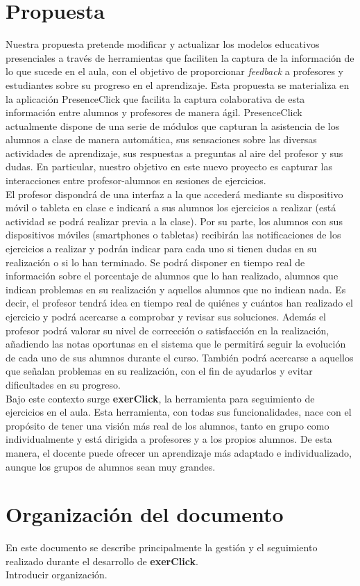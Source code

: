 \section{Propuesta}

Nuestra propuesta pretende modificar y actualizar los modelos educativos presenciales a través de herramientas que faciliten la captura de la información de lo que sucede en el aula, con el objetivo de proporcionar \textit{feedback} a profesores y estudiantes sobre su progreso en el aprendizaje. Esta propuesta se materializa en la aplicación PresenceClick que facilita la captura colaborativa de esta información entre alumnos y profesores de manera ágil. PresenceClick actualmente dispone de una serie de módulos que capturan la asistencia de los alumnos a clase de manera automática, sus sensaciones sobre las diversas actividades de aprendizaje, sus respuestas a preguntas al aire del profesor y sus dudas. En particular, nuestro objetivo en este nuevo proyecto es capturar las interacciones entre profesor-alumnos en sesiones de ejercicios.\\

El profesor dispondrá de una interfaz a la que accederá mediante su dispositivo móvil o tableta en clase e indicará a sus alumnos los ejercicios a realizar (está actividad se podrá realizar previa a la clase). Por su parte, los alumnos con sus dispositivos móviles (smartphones o tabletas) recibirán las notificaciones de los ejercicios a realizar y podrán indicar para cada uno si tienen dudas en su realización o si lo han terminado. Se podrá disponer en tiempo real de información sobre el porcentaje de alumnos que lo han realizado, alumnos que indican problemas en su realización y aquellos alumnos que no indican nada. Es decir, el profesor tendrá idea en tiempo real de quiénes y cuántos han realizado el ejercicio y podrá acercarse a comprobar y revisar sus soluciones. Además el profesor podrá valorar su nivel de corrección o satisfacción en la realización, añadiendo las notas oportunas en el sistema que le permitirá seguir la evolución de cada uno de sus alumnos durante el curso. También podrá acercarse a aquellos que señalan problemas en su realización, con el fin de ayudarlos y evitar dificultades en su progreso.\\

Bajo este contexto surge \textbf{exerClick}, la herramienta para seguimiento de ejercicios en el aula. Esta herramienta, con todas sus funcionalidades, nace con el propósito de tener una visión más real de los alumnos, tanto en grupo como individualmente y está dirigida a profesores y a los propios alumnos. De esta manera, el docente puede ofrecer un aprendizaje más adaptado e individualizado, aunque los grupos de alumnos sean muy grandes.\\

\section{Organización del documento}

En este documento se describe principalmente la gestión y el seguimiento realizado durante el desarrollo de \textbf{exerClick}.\\

Introducir organización.\\